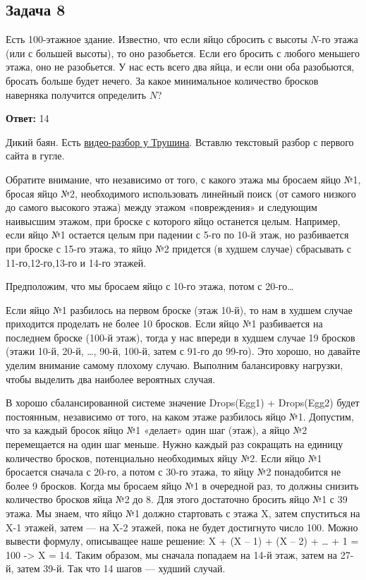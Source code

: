 \subsection{Задача 8}

Есть 100-этажное здание. Известно, что если яйцо сбросить с высоты $N$-го этажа
(или с большей высоты), то оно разобьется. Если его бросить с любого меньшего этажа, оно не разобьется. У нас есть всего два яйца, и если они оба разобьются, бросать
больше будет нечего. За какое минимальное количество бросков наверняка получится определить $N$?

\textbf{Ответ:} 14

Дикий баян. Есть  \href{https://youtu.be/f2VLdwU9xc4?si=poEv93D02R2l0ry1&t=2396}{видео-разбор у Трушина}. Вставлю текстовый разбор с первого сайта в гугле.

Обратите внимание, что независимо от того, с какого этажа мы бросаем яйцо №1, бросая яйцо №2, необходимого использовать линейный поиск (от самого низкого до самого высокого этажа) между этажом «повреждения» и следующим наивысшим этажом, при броске с которого яйцо останется целым. Например, если яйцо №1 остается целым при падении с 5-го по 10-й этаж, но разбивается при броске с 15-го этажа, то яйцо №2 придется (в худшем случае) сбрасывать с 11-го,12-го,13-го и 14-го этажей.

Предположим, что мы бросаем яйцо с 10-го этажа, потом с 20-го…

Если яйцо №1 разбилось на первом броске (этаж 10-й), то нам в худшем случае приходится проделать не более 10 бросков.
Если яйцо №1 разбивается на последнем броске (100-й этаж), тогда у нас впереди в худшем случае 19 бросков (этажи 10-й, 20-й, …, 90-й, 100-й, затем с 91-го до 99-го).
Это хорошо, но давайте уделим внимание самому плохому случаю. Выполним балансировку нагрузки, чтобы выделить два наиболее вероятных случая.

В хорошо сбалансированной системе значение Drops(Egg1) + Drops(Egg2) будет постоянным, независимо  от того, на каком этаже разбилось яйцо №1.
Допустим, что за каждый бросок яйцо №1 «делает» один шаг (этаж), а яйцо №2 перемещается на один шаг меньше.
Нужно каждый раз сокращать на единицу количество бросков, потенциально необходимых яйцу №2. Если яйцо №1 бросается сначала с 20-го, а потом с 30-го этажа, то яйцу №2 понадобится не более 9 бросков. Когда мы бросаем яйцо №1 в очередной раз, то должны снизить количество бросков яйца №2 до 8. Для этого достаточно бросить яйцо №1 с 39 этажа.
Мы знаем, что яйцо №1 должно стартовать с этажа X, затем спуститься на X-1 этажей, затем — на X-2 этажей, пока не будет достигнуто число 100.
Можно вывести формулу, описыващее наше решение:  X + (X – 1) + (X – 2) + … + 1 = 100 -> X = 14.
Таким образом, мы сначала попадаем на 14-й этаж, затем на 27-й, затем 39-й. Так что 14 шагов — худший случай.

